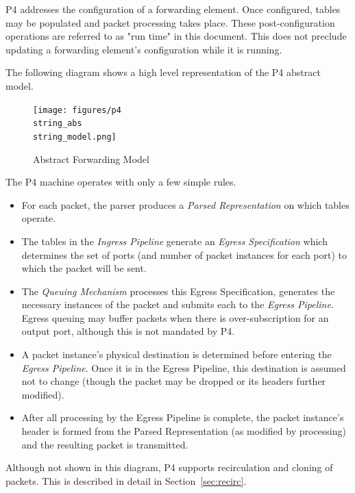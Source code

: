 \documentclass[12pt]{article}
\begin{document}
P4 addresses the configuration of a forwarding element. Once configured, tables 
may be populated and packet processing takes place. These post-configuration 
operations are referred to as "run time" in this document. This does not preclude 
updating a forwarding element's configuration while it is running.

The following diagram shows a high level representation of the P4 abstract 
model.

\begin{figure}[h!]
    \centering
    \texttt{[image: figures/p4\\string\_abs\\string\_model.png]}
    \caption{Abstract Forwarding Model}
    \label{fig:abstractmodel}
\end{figure}

The P4 machine operates with only a few simple rules. 

\begin{itemize}
\item
For each packet, the parser produces a \textit{Parsed Representation}
on which \matchaction tables operate.
\item
The \matchaction tables in the \textit{Ingress Pipeline} generate an
\textit{Egress Specification }which determines the set of ports (and
number of packet instances for each port) to which the packet will be
sent.
\item
The \textit{Queuing Mechanism} processes this Egress Specification,
generates the necessary instances of the packet and submits each to
the \textit{Egress Pipeline}.  Egress queuing may buffer packets when
there is over-subscription for an output port, although this is not
mandated by P4.
\item
A packet instance's physical destination is determined before entering
the \textit{Egress Pipeline}.  Once it is in the Egress Pipeline, this
destination is assumed not to change (though the packet may be dropped
or its headers further modified).
\item
After all processing by the Egress Pipeline is complete, the packet
instance's header is formed from the Parsed Representation (as
modified by \matchaction processing) and the resulting packet is
transmitted.
\end{itemize}


Although not shown in this diagram, P4 supports recirculation and cloning 
of packets.  This is described in detail in Section~\ref{sec:recirc}.
\end{document}

